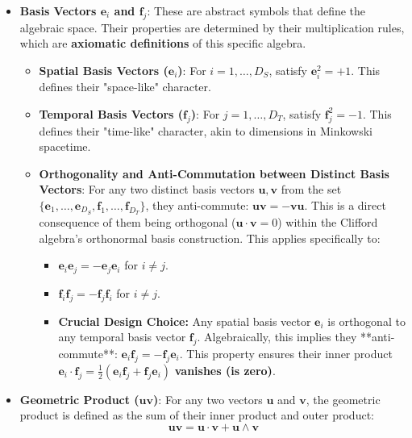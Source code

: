 \documentclass[11pt]{article}
\begin{document}
\begin{itemize}
    \item \textbf{Basis Vectors $\mathbf{e}_i$ and $\mathbf{f}_j$}: These are abstract symbols that define the algebraic space. Their properties are determined by their multiplication rules, which are \textbf{axiomatic definitions} of this specific algebra.
        \begin{itemize}
            \item \textbf{Spatial Basis Vectors ($\mathbf{e}_i$)}: For $i=1,\dots,D_S$, satisfy $\mathbf{e}_i^2 = +1$. This defines their "space-like" character.
            \item \textbf{Temporal Basis Vectors ($\mathbf{f}_j$)}: For $j=1,\dots,D_T$, satisfy $\mathbf{f}_j^2 = -1$. This defines their "time-like" character, akin to dimensions in Minkowski spacetime.
            \item \textbf{Orthogonality and Anti-Commutation between Distinct Basis Vectors}: For any two distinct basis vectors $\mathbf{u}, \mathbf{v}$ from the set $\{\mathbf{e}_1, \dots, \mathbf{e}_{D_S}, \mathbf{f}_1, \dots, \mathbf{f}_{D_T}\}$, they anti-commute: $\mathbf{u}\mathbf{v} = -\mathbf{v}\mathbf{u}$. This is a direct consequence of them being orthogonal ($\mathbf{u} \cdot \mathbf{v} = 0$) within the Clifford algebra's orthonormal basis construction. This applies specifically to:
                \begin{itemize}
                    \item $\mathbf{e}_i \mathbf{e}_j = -\mathbf{e}_j \mathbf{e}_i$ for $i \ne j$.
                    \item $\mathbf{f}_i \mathbf{f}_j = -\mathbf{f}_j \mathbf{f}_i$ for $i \ne j$.
                    \item \textbf{Crucial Design Choice:} Any spatial basis vector $\mathbf{e}_i$ is orthogonal to any temporal basis vector $\mathbf{f}_j$. Algebraically, this implies they **anti-commute**: $\mathbf{e}_i \mathbf{f}_j = -\mathbf{f}_j \mathbf{e}_i$. This property ensures their inner product $\mathbf{e}_i \cdot \mathbf{f}_j = \frac{1}{2}(\mathbf{e}_i \mathbf{f}_j + \mathbf{f}_j \mathbf{e}_i)$ \textbf{vanishes (is zero)}.
                \end{itemize}
        \end{itemize}
    \item \textbf{Geometric Product ($\mathbf{uv}$)}: For any two vectors $\mathbf{u}$ and $\mathbf{v}$, the geometric product is defined as the sum of their inner product and outer product:
        $$ \mathbf{uv} = \mathbf{u} \cdot \mathbf{v} + \mathbf{u} \wedge \mathbf{v} $$

\end{itemize}
\end{document}
